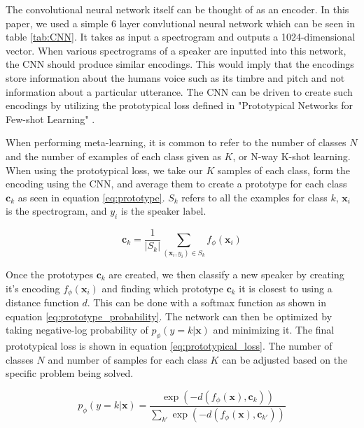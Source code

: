 \documentclass{article}
\begin{document}
The convolutional neural network itself can be thought of as an encoder. In this paper, we used a simple 6 layer 
convlutional neural network which can be seen in table \ref{tab:CNN}. It takes as input a spectrogram and outputs a
1024-dimensional vector. When various spectrograms of a speaker are inputted into this network, the CNN should produce
similar encodings. This would imply that the encodings store information about the humans voice such as its timbre and 
pitch and not information about a particular utterance. The CNN can be driven to create such encodings by utilizing the
prototypical loss defined in "Prototypical Networks for Few-shot Learning" \cite{DBLP:journals/corr/SnellSZ17}.

When performing meta-learning, it is common to refer to the number of classes $N$ and the number of examples of each class
given as $K$, or N-way K-shot learning. When using the prototypical loss, we take our $K$ samples of each class, form the
encoding using the CNN, and average them to create a prototype for each class $\mathbf{c}_k$ as seen in equation \ref{eq:prototype}.
$S_k$ refers to all the examples for class $k$, $\mathbf{x}_i$ is the spectrogram, and $y_i$ is the speaker label.

\begin{equation}
  \mathbf{c}_k = \frac{1}{|S_k|} \sum_{\left(\mathbf{x}_i, y_i\right) \in S_k} f_\phi\left(\mathbf{x}_i\right)
  \label{eq:prototype}
\end{equation}

Once the prototypes $\mathbf{c}_k$ are created, we then classify a new speaker by creating it's encoding 
$f_\phi\left(\mathbf{x}_i\right)$ and finding which prototype $\mathbf{c}_k$ it is closest to using a distance function
$d$. This can be done with a softmax function as shown in equation \ref{eq:prototype_probability}. The network can then 
be optimized by taking negative-log probability of $p_\phi\left(y=k | \mathbf{x}\right)$ and minimizing it. The final
prototypical loss is shown in equation \ref{eq:prototypical_loss}. The number of classes $N$ and number of samples for
each class $K$ can be adjusted based on the specific problem being solved.

\begin{equation}
  p_\phi\left(y=k | \mathbf{x}\right) = \frac{\exp\left(-d\left(f_\phi\left(\mathbf{x}\right), \mathbf{c}_k\right)\right)}{\sum_{k'} \exp\left(-d\left(f_\phi\left(\mathbf{x}\right), \mathbf{c}_{k'}\right)\right) }
  \label{eq:prototype_probability}
\end{equation}
\end{document}
